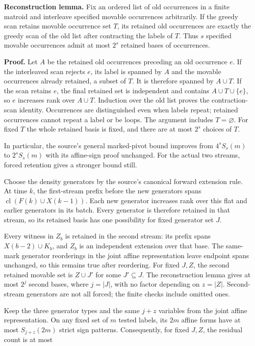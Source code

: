 \documentclass[11pt]{article}
\begin{document}
\textbf{Reconstruction lemma.} Fix an ordered list of old occurrences in a finite matroid and interleave specified movable occurrences arbitrarily. If the greedy scan retains movable occurrence set \(T\), its retained old occurrences are exactly the greedy scan of the old list after contracting the labels of \(T\). Thus \(s\) specified movable occurrences admit at most \(2^s\) retained bases of occurrences.

\textbf{Proof.} Let \(A\) be the retained old occurrences preceding an old occurrence \(e\). If the interleaved scan rejects \(e\), its label is spanned by \(A\) and the movable occurrences already retained, a subset of \(T\). It is therefore spanned by \(A\cup T\). If the scan retains \(e\), the final retained set is independent and contains \(A\cup T\cup\{e\}\), so \(e\) increases rank over \(A\cup T\). Induction over the old list proves the contraction-scan identity. Occurrences are distinguished even when labels repeat; retained occurrences cannot repeat a label or be loops. The argument includes \(T=\varnothing\). For fixed \(T\) the whole retained basis is fixed, and there are at most \(2^s\) choices of \(T\).

In particular, the source's general marked-pivot bound improves from \(4^sS_s(m)\) to \(2^sS_s(m)\) with its affine-sign proof unchanged. For the actual two streams, forced retention gives a stronger bound still.

Choose the density generators by the source's canonical forward extension rule. At time \(k\), the first-stream prefix before the new generators spans \(\operatorname{cl}(F(k)\cup X(k-1))\). Each new generator increases rank over this flat and earlier generators in its batch. Every generator is therefore retained in that stream, so its retained basis has one possibility for fixed generator set \(J\).

Every witness in \(Z_b\) is retained in the second stream: its prefix spans \(X(b-2)\cup K_b\), and \(Z_b\) is an independent extension over that base. The same-mark generator reorderings in the joint affine representation leave endpoint spans unchanged, so this remains true after reordering. For fixed \(J,Z\), the second retained movable set is \(Z\cup J'\) for some \(J'\subseteq J\). The reconstruction lemma gives at most \(2^j\) second bases, where \(j=|J|\), with no factor depending on \(z=|Z|\). Second-stream generators are not all forced; the finite checks include omitted ones.

Keep the three generator types and the same \(j+z\) variables from the joint affine representation. On any fixed set of \(m\) tested labels, its \(2m\) affine forms have at most \(S_{j+z}(2m)\) strict sign patterns. Consequently, for fixed \(J,Z\), the residual count is at most
\end{document}
